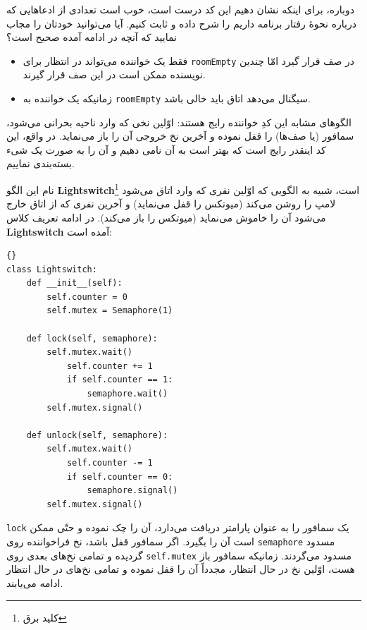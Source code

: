 \documentclass{book}
\begin{document}
    دوباره، برای اینکه نشان دهیم این کد درست است، خوب است 
    تعدادی از ادعاهایی که درباره نحوهٔ رفتار برنامه داریم را شرح داده و ثابت کنیم. 
    آیا می‌توانید خودتان را مجاب نمایید که آنچه در ادامه آمده صحیح است؟

\begin{itemize}

\item 
    فقط یک خواننده می‌تواند در انتظار برای {\tt roomEmpty} در صف قرار گیرد امّا چندین نویسنده ممکن است در این صف قرار گیرند. 

\item 
    زمانیکه یک خواننده به {\tt roomEmpty} سیگنال می‌دهد اتاق باید خالی باشد. 
\end{itemize}


    الگوهای مشابه این کدِ خواننده رایج هستند: اوّلین نخی که وارد ناحیه بحرانی می‌شود، سمافور (یا صف‌ها) را قفل نموده و آخرین نخ خروجی آن را باز می‌نماید. 
    در واقع، این کد اینقدر رایج است که بهتر است به آن نامی دهیم و آن را به صورت یک شیء بسته‌بندی نماییم. 
    
    نام این الگو {\bf Lightswitch}\footnote{کلید برق} است، شبیه به الگویی که اوّلین نفری که وارد اتاق می‌شود لامپ را روشن می‌کند  (میوتکس
    را قفل می‌نماید) و آخرین نفری که از اتاق خارج می‌شود آن را خاموش می‌نماید (میوتکس را باز می‌کند).
    در ادامه تعریف کلاس {\bf Lightswitch} آمده است: 
\begin{latin}
\begin{lstlisting}[title={\rl{تعریف} Lightswitch }]{}
class Lightswitch:
    def __init__(self):
        self.counter = 0
        self.mutex = Semaphore(1)

    def lock(self, semaphore):
        self.mutex.wait()
            self.counter += 1
            if self.counter == 1:
                semaphore.wait()
        self.mutex.signal()

    def unlock(self, semaphore):
        self.mutex.wait()
            self.counter -= 1
            if self.counter == 0:
                semaphore.signal()
        self.mutex.signal()
\end{lstlisting}
\end{latin}

    {\tt lock} 
    یک سمافور را به عنوان پارامتر دریافت می‌دارد، آن را چک نموده و حتّی ممکن است آن را بگیرد. 
    اگر سمافور قفل باشد، نخ فراخواننده روی  {\tt semaphore} مسدود گردیده و تمامی نخ‌های بعدی روی {\tt self.mutex} مسدود می‌گردند. 
    زمانیکه سمافور باز هست، اوّلین نخ در حال انتظار، مجدداً  آن را قفل نموده و تمامی نخ‌های در حال انتظار ادامه می‌یابند. 
\end{document}
